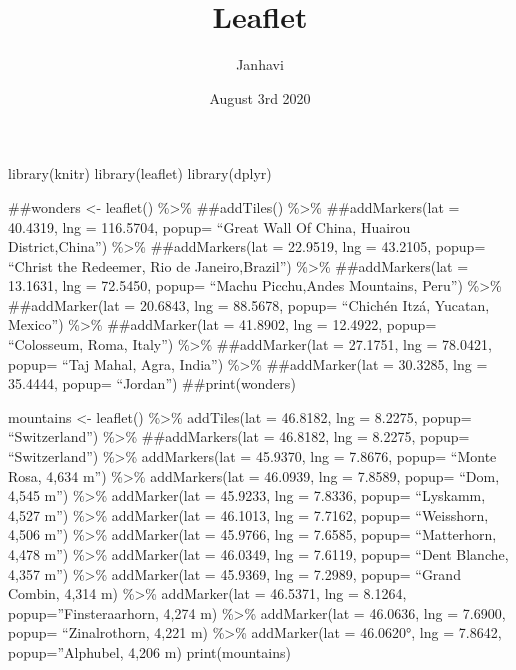 \documentclass[
]{article}
\title{Leaflet}
\author{Janhavi}
\date{August 3rd 2020}
\begin{document}
\maketitle

library(knitr) library(leaflet) library(dplyr)

\#\#wonders \textless- leaflet() \%\textgreater\% \#\#addTiles()
\%\textgreater\% \#\#addMarkers(lat = 40.4319, lng = 116.5704, popup=
``Great Wall Of China, Huairou District,China'') \%\textgreater\%
\#\#addMarkers(lat = 22.9519, lng = 43.2105, popup= ``Christ the
Redeemer, Rio de Janeiro,Brazil'') \%\textgreater\% \#\#addMarkers(lat =
13.1631, lng = 72.5450, popup= ``Machu Picchu,Andes Mountains, Peru'')
\%\textgreater\% \#\#addMarker(lat = 20.6843, lng = 88.5678, popup=
``Chichén Itzá, Yucatan, Mexico'') \%\textgreater\% \#\#addMarker(lat =
41.8902, lng = 12.4922, popup= ``Colosseum, Roma, Italy'')
\%\textgreater\% \#\#addMarker(lat = 27.1751, lng = 78.0421, popup=
``Taj Mahal, Agra, India'') \%\textgreater\% \#\#addMarker(lat =
30.3285, lng = 35.4444, popup= ``Jordan'') \#\#print(wonders)

mountains \textless- leaflet() \%\textgreater\% addTiles(lat = 46.8182,
lng = 8.2275, popup= ``Switzerland'') \%\textgreater\%
\#\#addMarkers(lat = 46.8182, lng = 8.2275, popup= ``Switzerland'')
\%\textgreater\% addMarkers(lat = 45.9370, lng = 7.8676, popup= ``Monte
Rosa, 4,634 m'') \%\textgreater\% addMarkers(lat = 46.0939, lng =
7.8589, popup= ``Dom, 4,545 m'') \%\textgreater\% addMarker(lat =
45.9233, lng = 7.8336, popup= ``Lyskamm, 4,527 m'') \%\textgreater\%
addMarker(lat = 46.1013, lng = 7.7162, popup= ``Weisshorn, 4,506 m'')
\%\textgreater\% addMarker(lat = 45.9766, lng = 7.6585, popup=
``Matterhorn, 4,478 m'') \%\textgreater\% addMarker(lat = 46.0349, lng =
7.6119, popup= ``Dent Blanche, 4,357 m'') \%\textgreater\% addMarker(lat
= 45.9369, lng = 7.2989, popup= ``Grand Combin, 4,314 m)
\%\textgreater\% addMarker(lat = 46.5371, lng = 8.1264,
popup=''Finsteraarhorn, 4,274 m) \%\textgreater\% addMarker(lat =
46.0636, lng = 7.6900, popup= ``Zinalrothorn, 4,221 m) \%\textgreater\%
addMarker(lat = 46.0620°, lng = 7.8642, popup=''Alphubel, 4,206 m)
print(mountains)
\end{document}
